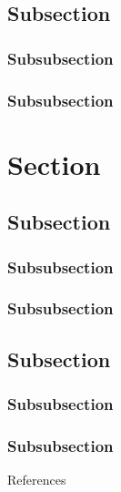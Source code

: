\documentclass[
11pt,notheorems,hyperref={pdfauthor=whatever}
]{beamer}
\begin{document}
\subsection{Subsection}
\subsubsection{Subsubsection}
\subsubsection{Subsubsection}
\section{Section}
\subsection{Subsection}
\subsubsection{Subsubsection}
\subsubsection{Subsubsection}
\subsection{Subsection}
\subsubsection{Subsubsection}
\subsubsection{Subsubsection}


\begin{frame}[allowframebreaks]{References}
    \printbibliography
\end{frame}
\end{document}
